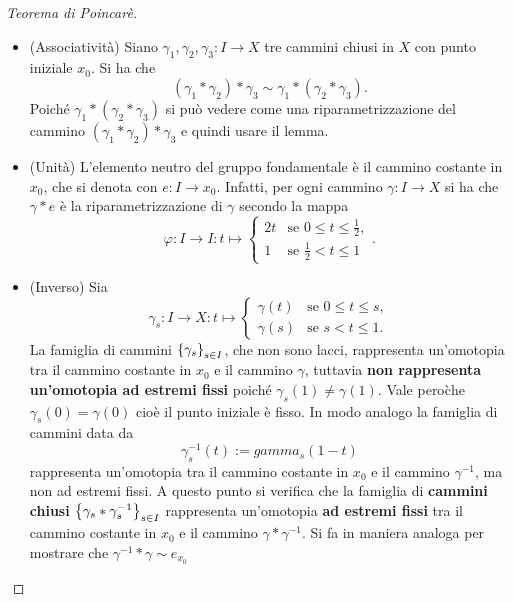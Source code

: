 \documentclass[]{article}
\begin{document}
    \begin{proof} [Teorema di Poincar\`e] \nl
        \begin{itemize}
            \item (Associatività) \nl
            Siano $\gamma_1, \gamma_2, \gamma_3: I \to X$ tre cammini chiusi in $X$ con punto iniziale $x_0$.
            Si ha che
            \[
                (\gamma_1 * \gamma_2) * \gamma_3 \sim \gamma_1 * (\gamma_2 * \gamma_3).
            \]
            Poich\'e $\gamma_1 * (\gamma_2 * \gamma_3)$ si pu\`o vedere come una riparametrizzazione
            del cammino $(\gamma_1 * \gamma_2) * \gamma_3$ e quindi usare il lemma.
            \item (Unità) \nl
            L'elemento neutro del gruppo fondamentale è il cammino costante in $x_0$, che si denota con $e: I \to {x_0}$. \nl
            Infatti, per ogni cammino $\gamma: I \to X$ si ha che
            $\gamma * e $ \`e la riparametrizzazione di $\gamma$ secondo la mappa
            \[
                \varphi: I \to I: t \mapsto \begin{cases}
                    2t & \text{se } 0 \leq t \leq \frac{1}{2}, \\
                    1 & \text{se } \frac{1}{2} < t \leq 1
                \end{cases}.
            \]
            \item (Inverso) \nl
            Sia 
            \[
                \gamma_s: I \to X: t \mapsto
                \begin{cases}
                    \gamma(t) & \text{se } 0 \leq t \leq s, \\
                    \gamma(s) & \text{se } s < t \leq 1.
                \end{cases}
            \]
            La famiglia di cammini $\left\{ \gamma_s \right\}_{s \in I}$, che non sono lacci, rappresenta un'omotopia tra il cammino costante in $x_0$ e il cammino 
            $\gamma$, tuttavia \textbf{non rappresenta un'omotopia ad estremi fissi} poiché $\gamma_s(1) \neq \gamma(1)$.
            Vale pero\` che $\gamma_s(0) = \gamma(0)$ cio\`e il punto iniziale \`e fisso. \nl
            In modo analogo la famiglia di cammini data da 
            \[
                \gamma_s^{-1}(t) := gamma_s(1-t) 
            \]
            rappresenta un'omotopia tra il cammino costante in $x_0$ e il cammino $\gamma^{-1}$, ma non ad estremi fissi. \nl
            A questo punto si verifica che la famiglia di \textbf{cammini chiusi} $\left\{ \gamma_s * \gamma_s^{-1} \right\}_{s \in I}$ rappresenta un'omotopia \textbf{ad estremi fissi} 
            tra il cammino costante in $x_0$ e il cammino $\gamma * \gamma^{-1}$. \nl
            Si fa in maniera analoga per mostrare che $\gamma^{-1} * \gamma \sim e_{x_0}$
        \end{itemize}
    \end{proof}
\end{document}
